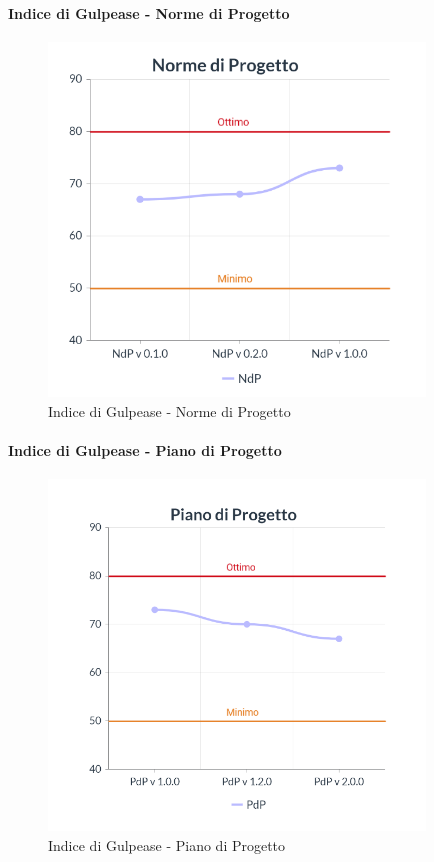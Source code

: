 \paragraph{Indice di Gulpease - Norme di Progetto}
\begin{center}
\begin{figure}[H]
  \centering
  \renewcommand{\thefigure}{9}
  \includegraphics[width=10cm]{./res/images/NdPGraph.png}
  \caption{Indice di Gulpease - Norme di Progetto}
  \label{fig:Indice di Gulpease - Norme di Progetto}
\end{figure}
\end{center}
\pagebreak
\paragraph{Indice di Gulpease - Piano di Progetto}
\begin{center}
\begin{figure}[H]
  \centering
  \renewcommand{\thefigure}{10}
  \includegraphics[width=10cm]{./res/images/PdPGraph.png}
  \caption{Indice di Gulpease - Piano di Progetto}
  \label{fig:Indice di Gulpease - Piano di Progetto}
\end{figure}
\end{center}
\pagebreak
